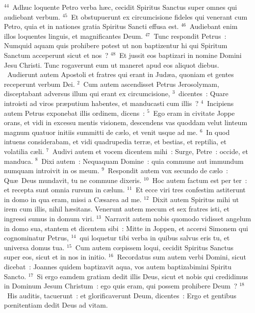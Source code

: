 ${}^{44}$~Adhuc loquente Petro verba h\ae c, cecidit Spiritus Sanctus super omnes qui audiebant verbum.
${}^{45}$~Et obstupuerunt ex circumcisione fideles qui venerant cum Petro, quia et in nationes gratia Spiritus Sancti effusa est.
${}^{46}$~Audiebant enim illos loquentes linguis, et magnificantes Deum.
${}^{47}$~Tunc respondit Petrus~: Numquid aquam quis prohibere potest ut non baptizentur hi qui Spiritum Sanctum acceperunt sicut et nos~?
${}^{48}$~Et jussit eos baptizari in nomine Domini Jesu Christi. Tunc rogaverunt eum ut maneret apud eos aliquot diebus.
~\lettrine[lines=10,image=true,loversize=0.05,lraise=-0.03]{A}{}udierunt autem Apostoli et fratres qui erant in Jud\ae a, quoniam et gentes receperunt verbum Dei.
${}^{2}$~Cum autem ascendisset Petrus Jerosolymam, disceptabant adversus illum qui erant ex circumcisione,
${}^{3}$~dicentes~: Quare introisti ad viros pr\ae putium habentes, et manducasti cum illis~?
${}^{4}$~Incipiens autem Petrus exponebat illis ordinem, dicens~:
${}^{5}$~Ego eram in civitate Joppe orans, et vidi in excessu mentis visionem, descendens vas quoddam velut linteum magnum quatuor initiis summitti de c\ae lo, et venit usque ad me.
${}^{6}$~In quod intuens considerabam, et vidi quadrupedia terr\ae , et bestias, et reptilia, et volatilia c\ae li.
${}^{7}$~Audivi autem et vocem dicentem mihi~: Surge, Petre~: occide, et manduca.
${}^{8}$~Dixi autem~: Nequaquam Domine~: quia commune aut immundum numquam introivit in os meum.
${}^{9}$~Respondit autem vox secundo de c\ae lo~: Qu\ae\ Deus mundavit, tu ne commune dixeris.
${}^{10}$~Hoc autem factum est per ter~: et recepta sunt omnia rursum in c\ae lum.
${}^{11}$~Et ecce viri tres confestim astiterunt in domo in qua eram, missi a C\ae sarea ad me.
${}^{12}$~Dixit autem Spiritus mihi ut irem cum illis, nihil h\ae sitans. Venerunt autem mecum et sex fratres isti, et ingressi sumus in domum viri.
${}^{13}$~Narravit autem nobis quomodo vidisset angelum in domo sua, stantem et dicentem sibi~: Mitte in Joppen, et accersi Simonem qui cognominatur Petrus,
${}^{14}$~qui loquetur tibi verba in quibus salvus eris tu, et universa domus tua.
${}^{15}$~Cum autem cœpissem loqui, cecidit Spiritus Sanctus super eos, sicut et in nos in initio.
${}^{16}$~Recordatus sum autem verbi Domini, sicut dicebat~: Joannes quidem baptizavit aqua, vos autem baptizabimini Spiritu Sancto.
${}^{17}$~Si ergo eamdem gratiam dedit illis Deus, sicut et nobis qui credidimus in Dominum Jesum Christum~: ego quis eram, qui possem prohibere Deum~?
${}^{18}$~His auditis, tacuerunt~: et glorificaverunt Deum, dicentes~: Ergo et gentibus pœnitentiam dedit Deus ad vitam.


